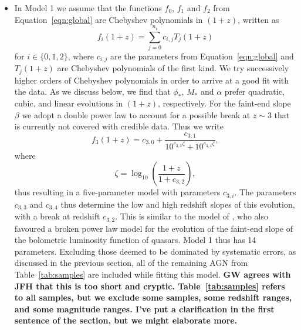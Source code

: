 \documentclass[fleqn,usenatbib]{mnras}
\begin{document}
\begin{itemize}

\item
  In Model 1 we assume that the functions $f_0$, $f_1$ and $f_2$ from
  Equation~\eqref{eqn:global} are Chebyshev polynomials in $\left(1+z\right)$,
  written as
  \begin{equation}
    f_i\left(1+z\right)=\sum_{j=0}^{n_i}c_{i,j}T_j\left(1+z\right)
    \label{eqn:cbs}
  \end{equation}
  for $i\in\{0,1,2\}$, where $c_{i,j}$ are the parameters from
  Equation~\eqref{eqn:global} and $T_j\left(1+z\right)$ are Chebyshev
  polynomials of the first kind. We try successively higher orders of
  Chebyshev polynomials in order to arrive at a good fit with the
  data.
  As we discuss below, we find that $\phi_*$, $M_*$ and
  $\alpha$ prefer quadratic, cubic, and linear evolutions in $\left(1+z\right)$, respectively.
  For the faint-end slope $\beta$ we adopt a double power law to account
  for a possible break at $z\sim 3$ that is currently not covered with credible data.
  Thus we write
  \begin{equation}
    f_3\left(1+z\right)=c_{3,0}+\frac{c_{3,1}}{10^{c_{3,3}\zeta}+10^{c_{3,4}\zeta}},
    \label{eqn:beta}
  \end{equation}
  where
  \begin{equation}
    \zeta = \log_{10}\left(\frac{1+z}{1+c_{3,2}}\right),
  \end{equation}
  thus resulting in a five-parameter model with parameters $c_{3,i}$.
  The parameters $c_{3,3}$ and $c_{3,4}$ thus determine the low and
  high redshift slopes of this evolution, with a break at redshift
  $c_{3,2}$.
  This is similar to the model of
  \citet{2007ApJ...654..731H}, who also favoured a broken power law
  model for the evolution of the faint-end slope of the bolometric
  luminosity function of quasars.  Model 1 thus has 14 parameters.
  Excluding those deemed to be dominated by systematic errors, as
  discussed in the previous section, all of the remaining AGN from
  Table~\ref{tab:samples} are included while fitting this model.
  \textbf{GW agrees with JFH that this is too short and cryptic. Table~\ref{tab:samples} refers to all samples, but we exclude some samples, some redshift ranges, and some magnitude ranges. I've put a clarification in the first sentence of the section, but we might elaborate more.}


\end{itemize}
\end{document}
